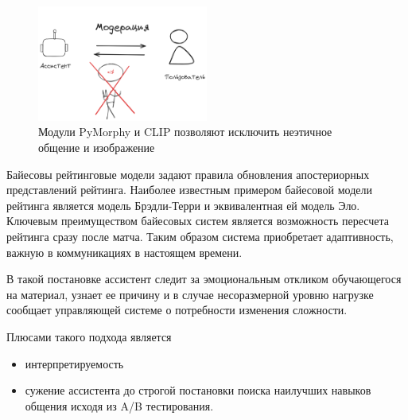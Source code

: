 \begin{figure}[h]
    \centering
    \includegraphics[width=0.5\textwidth]{assets/work/arch/detox.excalidraw.png}
    \caption{Модули PyMorphy \cite{Korobov2015morph} и CLIP позволяют исключить неэтичное общение и изображение }
    \label{detox}
\end{figure}

Байесовы рейтинговые модели задают правила обновления апостериорных представлений рейтинга.
Наиболее известным примером байесовой модели рейтинга является модель Брэдли-Терри и эквивалентная ей модель Эло.
Ключевым преимуществом байесовых систем является возможность пересчета рейтинга сразу после матча.
 Таким образом система приобретает адаптивность, важную в коммуникациях в настоящем времени.

 В такой постановке ассистент следит за эмоциональным откликом обучающегося на материал,
узнает ее причину и в случае несоразмерной уровню нагрузке сообщает управляющей системе о потребности изменения сложности.

Плюсами такого подхода является \begin{itemize}
    \item интерпретируемость
    \item сужение ассистента до строгой постановки поиска наилучших навыков общения исходя из A/B тестирования.
\end{itemize}



